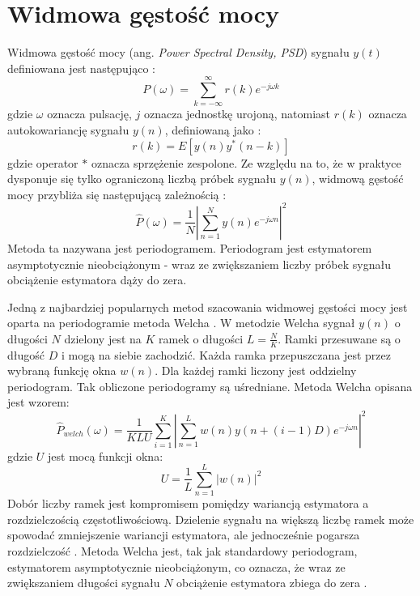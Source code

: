 \documentclass[notitlepage]{report}
\begin{document}
\section{Widmowa gęstość mocy}
Widmowa gęstość mocy (ang. \textit{Power Spectral Density, PSD}) sygnału $y(t)$ definiowana jest następująco \cite{stoica}:
\begin{equation}
P(\omega) = \sum_{k=-\infty}^{\infty}r(k)e^{-j\omega k}
\end{equation}
gdzie $\omega$ oznacza pulsację, $j$ oznacza jednostkę urojoną, natomiast $r(k)$ oznacza autokowariancję sygnału $y(n)$, definiowaną jako \cite{stoica}:
\begin{equation}
r(k) = E[y(n)y^*(n-k)]
\end{equation}
gdzie operator $*$ oznacza sprzężenie zespolone. Ze względu na to, że w praktyce dysponuje się tylko ograniczoną liczbą próbek sygnału $y(n)$, widmową gęstość mocy przybliża się następującą zależnością \cite{stoica}:
\begin{equation}
\hat{P}(\omega) = \frac{1}{N}\left|\sum_{n=1}^{N}y(n)e^{-j\omega n}\right|^2
\end{equation}
Metoda ta nazywana jest periodogramem. Periodogram jest estymatorem asymptotycznie nieobciążonym - wraz ze zwiększaniem liczby próbek sygnału obciążenie estymatora dąży do zera.

Jedną z najbardziej popularnych metod szacowania widmowej gęstości mocy jest oparta na periodogramie metoda Welcha \cite{welch}. W metodzie Welcha sygnał $y(n)$ o długości $N$ dzielony jest na $K$ ramek o długości $L = \frac{N}{K}$. Ramki przesuwane są o długość $D$ i mogą na siebie zachodzić. Każda ramka przepuszczana jest przez wybraną funkcję okna $w(n)$. Dla każdej ramki liczony jest oddzielny periodogram. Tak obliczone periodogramy są uśredniane. Metoda Welcha opisana jest wzorem:
\begin{equation}
\hat{P}_{welch}(\omega) = \frac{1}{KLU}\sum_{i=1}^{K}\left|\sum_{n=1}^{L}w(n)y\left(n+\left(i-1\right)D\right)e^{-j\omega n} \right|^2
\end{equation} 
gdzie $U$ jest mocą funkcji okna:
\begin{equation}
U = \frac{1}{L}\sum_{n=1}^{L}|w(n)|^2
\end{equation}
Dobór liczby ramek jest kompromisem pomiędzy wariancją estymatora a rozdzielczością częstotliwościową. Dzielenie sygnału na większą liczbę ramek może spowodać zmniejszenie wariancji estymatora, ale jednocześnie pogarsza rozdzielczość \cite{welch}. Metoda Welcha jest, tak jak standardowy periodogram, estymatorem asymptotycznie nieobciążonym, co oznacza, że wraz ze zwiększaniem długości sygnału $N$ obciążenie estymatora zbiega do zera \cite{stoica}.
\end{document}
